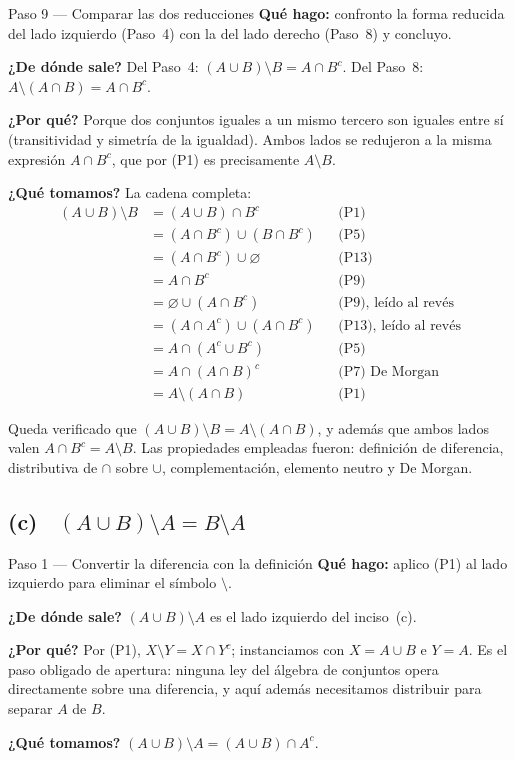 \documentclass[11pt]{article}
\begin{document}
\begin{paso}{Paso 9 --- Comparar las dos reducciones}
\textbf{Qué hago:} confronto la forma reducida del lado izquierdo (Paso~4) con la del lado
derecho (Paso~8) y concluyo.

\textbf{¿De dónde sale?} Del Paso~4: $(A\cup B)\setminus B=A\cap B^{c}$. Del Paso~8:
$A\setminus(A\cap B)=A\cap B^{c}$.

\textbf{¿Por qué?} Porque dos conjuntos iguales a un mismo tercero son iguales entre sí
(transitividad y simetría de la igualdad). Ambos lados se redujeron a la misma expresión
$A\cap B^{c}$, que por (P1) es precisamente $A\setminus B$.

\textbf{¿Qué tomamos?} La cadena completa:
\begin{align*}
(A\cup B)\setminus B
&=(A\cup B)\cap B^{c} && \text{(P1)}\\
&=(A\cap B^{c})\cup(B\cap B^{c}) && \text{(P5)}\\
&=(A\cap B^{c})\cup\varnothing && \text{(P13)}\\
&=A\cap B^{c} && \text{(P9)}\\
&=\varnothing\cup(A\cap B^{c}) && \text{(P9), leído al revés}\\
&=(A\cap A^{c})\cup(A\cap B^{c}) && \text{(P13), leído al revés}\\
&=A\cap(A^{c}\cup B^{c}) && \text{(P5)}\\
&=A\cap(A\cap B)^{c} && \text{(P7) De Morgan}\\
&=A\setminus(A\cap B) && \text{(P1)}
\end{align*}
\end{paso}

\begin{resp}
Queda verificado que $(A\cup B)\setminus B=A\setminus(A\cap B)$, y además que ambos lados valen
$A\cap B^{c}=A\setminus B$. Las propiedades empleadas fueron: definición de diferencia,
distributiva de $\cap$ sobre $\cup$, complementación, elemento neutro y De Morgan.
\end{resp}

\subsection*{(c) \ $(A\cup B)\setminus A=B\setminus A$}

\begin{paso}{Paso 1 --- Convertir la diferencia con la definición}
\textbf{Qué hago:} aplico (P1) al lado izquierdo para eliminar el símbolo $\setminus$.

\textbf{¿De dónde sale?} $(A\cup B)\setminus A$ es el lado izquierdo del inciso~(c).

\textbf{¿Por qué?} Por (P1), $X\setminus Y=X\cap Y^{c}$; instanciamos con $X=A\cup B$ e $Y=A$.
Es el paso obligado de apertura: ninguna ley del álgebra de conjuntos opera directamente sobre
una diferencia, y aquí además necesitamos distribuir para separar $A$ de $B$.

\textbf{¿Qué tomamos?} $(A\cup B)\setminus A=(A\cup B)\cap A^{c}$.
\end{paso}
\end{document}
